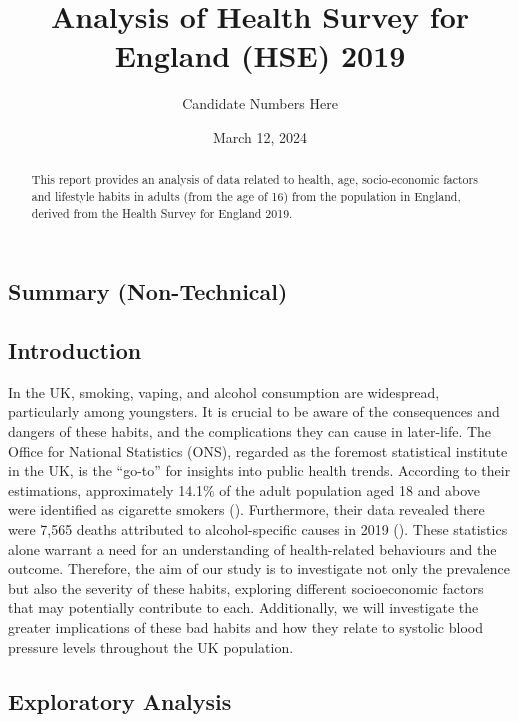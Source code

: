 \documentclass[
  11pt,
]{article}
\title{Analysis of Health Survey for England (HSE) 2019}
\author{Candidate Numbers Here}
\date{March 12, 2024}
\begin{document}
\maketitle
\begin{abstract}
This report provides an analysis of data related to health, age,
socio-economic factors and lifestyle habits in adults (from the age of
16) from the population in England, derived from the Health Survey for
England 2019.
\end{abstract}


\newpage

\subsection{Summary (Non-Technical)}\label{summary-non-technical}

\subsection{Introduction}\label{introduction}

In the UK, smoking, vaping, and alcohol consumption are widespread,
particularly among youngsters. It is crucial to be aware of the
consequences and dangers of these habits, and the complications they can
cause in later-life. The Office for National Statistics (ONS), regarded
as the foremost statistical institute in the UK, is the ``go-to'' for
insights into public health trends. According to their estimations,
approximately 14.1\% of the adult population aged 18 and above were
identified as cigarette smokers ().
Furthermore, their data revealed there were 7,565 deaths attributed to
alcohol-specific causes in 2019 (). These
statistics alone warrant a need for an understanding of health-related
behaviours and the outcome. Therefore, the aim of our study is to
investigate not only the prevalence but also the severity of these
habits, exploring different socioeconomic factors that may potentially
contribute to each. Additionally, we will investigate the greater
implications of these bad habits and how they relate to systolic blood
pressure levels throughout the UK population.

\subsection{Exploratory Analysis}\label{exploratory-analysis}
\end{document}
